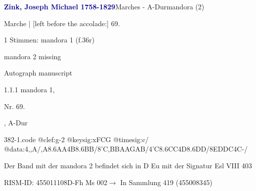 \documentclass[twocolumn, 12pt]{book}
\begin{document}
\par \vspace{16pt} \textcolor{darkblue}{\textbf{Zink, Joseph Michael  1758-1829}}\hfillplus{\textbf{[382]}}\newline Marches - A-Dur\newline mandora (2)
\par \begin{itshape}[f.36r, at left:] Marche | [left before the accolade:] 69.\end{itshape} 
\par \textcolor{darkblue}{}  1 Stimmen: mandora 1  (f.36r)\newline \begin{small} mandora 2 missing\end{small} \newline Autograph manuscript
\par 1.1.1  mandora 1, \begin{itshape}Nr. 69.\end{itshape}, A-Dur  
\begin{filecontents*}{382-1.code}
@clef:g-2
@keysig:xFCG
@timesig:c/
@data:4,,A/,A{8.6AA}4B{8.6BB}/8'C,BBAAGAB/4'C{8.6CC}4D{8.6DD}/8EDDC4C-/
\end{filecontents*}
\newline %
\par Der Band mit der mandora 2 befindet sich in D Eu mit der Signatur Esl VIII 403
\par RISM-ID: 455011108\newline D-Fh  Ms 002\newline $\rightarrow$ In Sammlung 419 (455008345)
      
\end{document}
